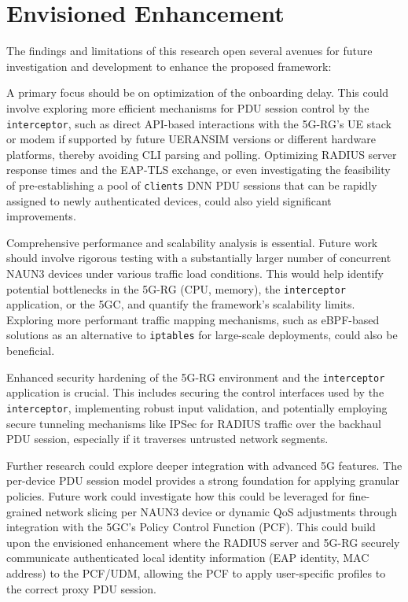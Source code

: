 \section{Envisioned Enhancement}

The findings and limitations of this research open several avenues for future investigation and development to enhance the proposed framework:

A primary focus should be on optimization of the onboarding delay. This could involve exploring more efficient mechanisms for \ac{PDU} session control by the \texttt{interceptor}, such as direct \ac{API}-based interactions with the \ac{5G-RG}'s \ac{UE} stack or modem if supported by future UERANSIM versions or different hardware platforms, thereby avoiding \ac{CLI} parsing and polling. Optimizing \ac{RADIUS} server response times and the \ac{EAP-TLS} exchange, or even investigating the feasibility of pre-establishing a pool of \texttt{clients} \ac{DNN} \ac{PDU} sessions that can be rapidly assigned to newly authenticated devices, could also yield significant improvements.

Comprehensive performance and scalability analysis is essential. Future work should involve rigorous testing with a substantially larger number of concurrent \ac{NAUN3} devices under various traffic load conditions. This would help identify potential bottlenecks in the \ac{5G-RG} (\ac{CPU}, memory), the \texttt{interceptor} application, or the \ac{5GC}, and quantify the framework's scalability limits. Exploring more performant traffic mapping mechanisms, such as \ac{eBPF}-based solutions as an alternative to \texttt{iptables} for large-scale deployments, could also be beneficial.

Enhanced security hardening of the \ac{5G-RG} environment and the \texttt{interceptor} application is crucial. This includes securing the control interfaces used by the \texttt{interceptor}, implementing robust input validation, and potentially employing secure tunneling mechanisms like \ac{IPSec} for \ac{RADIUS} traffic over the backhaul \ac{PDU} session, especially if it traverses untrusted network segments.

Further research could explore deeper integration with advanced \ac{5G} features. The per-device \ac{PDU} session model provides a strong foundation for applying granular policies. Future work could investigate how this could be leveraged for fine-grained network slicing per \ac{NAUN3} device or dynamic \ac{QoS} adjustments through integration with the \ac{5GC}'s Policy Control Function (\ac{PCF}). This could build upon the envisioned enhancement where the \ac{RADIUS} server and \ac{5G-RG} securely communicate authenticated local identity information (\ac{EAP} identity, \ac{MAC} address) to the \ac{PCF}/\ac{UDM}, allowing the \ac{PCF} to apply user-specific profiles to the correct proxy \ac{PDU} session.

